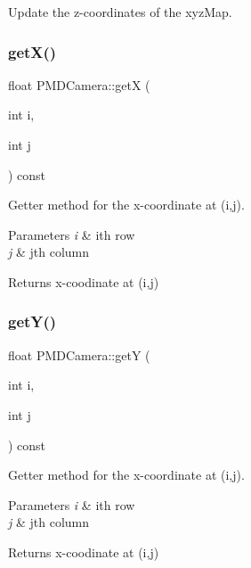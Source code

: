 Update the z-\/coordinates of the xyz\+Map. 

\hypertarget{class_p_m_d_camera_a6d5662f8c84cb9c12ad71a70159a6f3a}{}\label{class_p_m_d_camera_a6d5662f8c84cb9c12ad71a70159a6f3a} 
\subsubsection{\texorpdfstring{get\+X()}{getX()}}
{\footnotesize\ttfamily float P\+M\+D\+Camera\+::getX (\begin{DoxyParamCaption}\item[{int}]{i,  }\item[{int}]{j }\end{DoxyParamCaption}) const\hspace{0.3cm}{\ttfamily [private]}}



Getter method for the x-\/coordinate at (i,j). 


\begin{DoxyParams}{Parameters}
{\em i} & ith row \\
\hline
{\em j} & jth column \\
\hline
\end{DoxyParams}
\begin{DoxyReturn}{Returns}
x-\/coodinate at (i,j) 
\end{DoxyReturn}
\hypertarget{class_p_m_d_camera_a71344967a964b6c45fc7dfd8b5f56e63}{}\label{class_p_m_d_camera_a71344967a964b6c45fc7dfd8b5f56e63} 
\subsubsection{\texorpdfstring{get\+Y()}{getY()}}
{\footnotesize\ttfamily float P\+M\+D\+Camera\+::getY (\begin{DoxyParamCaption}\item[{int}]{i,  }\item[{int}]{j }\end{DoxyParamCaption}) const\hspace{0.3cm}{\ttfamily [private]}}



Getter method for the x-\/coordinate at (i,j). 


\begin{DoxyParams}{Parameters}
{\em i} & ith row \\
\hline
{\em j} & jth column \\
\hline
\end{DoxyParams}
\begin{DoxyReturn}{Returns}
x-\/coodinate at (i,j) 
\end{DoxyReturn}
\hypertarget{class_p_m_d_camera_a98254399959993d8a181f17402845457}{}\label{class_p_m_d_camera_a98254399959993d8a181f17402845457} 
